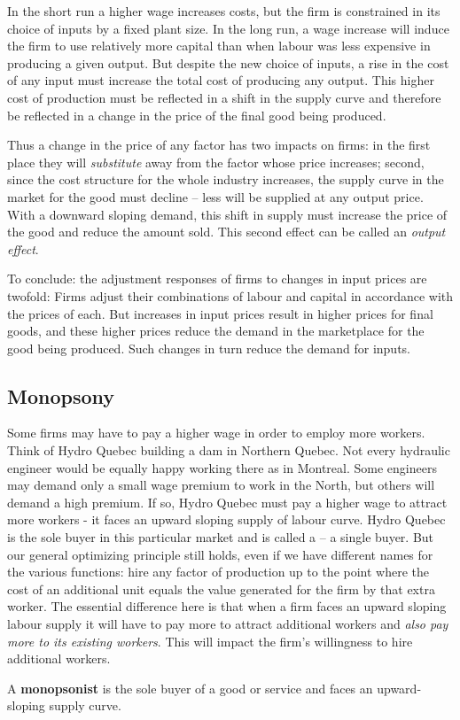 In the short run a higher wage increases costs, but the firm is constrained in its choice of inputs by a fixed plant size. In the long run, a wage increase will induce the firm to use relatively more capital than when labour was less expensive in producing a given output. But despite the new choice of inputs, a rise in the cost of any input must increase the total cost of producing any output. This higher cost of production must be reflected in a shift in the supply curve and therefore be reflected in a change in the price of the final good being produced.

Thus a change in the price of any factor has two impacts on firms: in the first place they will \textit{substitute} away from the factor whose price increases; second, since the cost structure for the whole industry increases, the supply curve in the market for the good must decline -- less will be supplied at any output price. With a downward sloping demand, this shift in supply must increase the price of the good and reduce the amount sold. This second effect can be called an \textit{output effect}. 

To conclude: the adjustment responses of firms to changes in input prices are twofold: Firms adjust their combinations of labour and capital in accordance with the prices of each.  But increases in input prices result in higher prices for final goods, and these higher prices reduce the demand in the marketplace for the good being produced. Such changes in turn reduce the demand for inputs.

\subsection*{Monopsony}

Some firms may have to pay a higher wage in order to employ more workers. Think of Hydro Quebec building a dam in Northern Quebec. Not every hydraulic engineer would be equally happy working there as in Montreal. Some engineers may demand only a small wage premium to work in the North, but others will demand a high premium. If so, Hydro Quebec must pay a higher wage to attract more workers - it faces an upward sloping supply of labour curve. Hydro Quebec is the sole buyer in this particular market and is called a  -- a single buyer. But our general optimizing principle still holds, even if we have different names for the various functions: hire any factor of production up to the point where the cost of an additional unit equals the value generated for the firm by that extra worker. The essential difference here is that when a firm faces an upward sloping labour supply it will have to pay more to attract additional workers and \textit{also pay more to its existing workers}. This will impact the firm's willingness to hire additional workers. 

\begin{DefBox}
A \textbf{monopsonist} is the sole buyer of a good or service and faces an upward-sloping supply curve.
\end{DefBox}